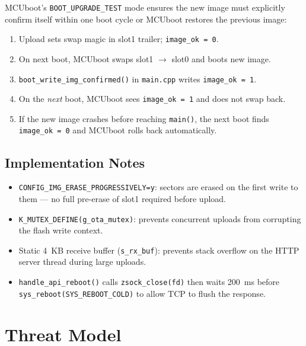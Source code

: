 \documentclass[11pt,a4paper]{article}
\begin{document}
MCUboot's \texttt{BOOT\_UPGRADE\_TEST} mode ensures the new image must explicitly confirm
itself within one boot cycle or MCUboot restores the previous image:

\begin{enumerate}[nosep]
\item Upload sets swap magic in slot1 trailer; \texttt{image\_ok = 0}.
\item On next boot, MCUboot swaps slot1 $\to$ slot0 and boots new image.
\item \texttt{boot\_write\_img\_confirmed()} in \texttt{main.cpp} writes \texttt{image\_ok = 1}.
\item On the \emph{next} boot, MCUboot sees \texttt{image\_ok = 1} and does not swap back.
\item If the new image crashes before reaching \texttt{main()}, the next boot finds
      \texttt{image\_ok = 0} and MCUboot rolls back automatically.
\end{enumerate}

\subsection{Implementation Notes}

\begin{itemize}[nosep]
\item \texttt{CONFIG\_IMG\_ERASE\_PROGRESSIVELY=y}: sectors are erased on the first write
      to them — no full pre-erase of slot1 required before upload.
\item \texttt{K\_MUTEX\_DEFINE(g\_ota\_mutex)}: prevents concurrent uploads from corrupting
      the flash write context.
\item Static 4~KB receive buffer (\texttt{s\_rx\_buf}): prevents stack overflow on the
      HTTP server thread during large uploads.
\item \texttt{handle\_api\_reboot()} calls \texttt{zsock\_close(fd)} then waits 200~ms
      before \texttt{sys\_reboot(SYS\_REBOOT\_COLD)} to allow TCP to flush the response.
\end{itemize}

\section{Threat Model}
\end{document}
